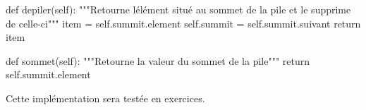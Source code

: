 \documentclass[
  a4paper,
  DIV=11,
  numbers=noendperiod]{scrartcl}
\newenvironment{Shaded}{\begin{snugshade}}{\end{snugshade}}
\newcommand{\CommentTok}[1]{\textcolor[rgb]{0.37,0.37,0.37}{#1}}
\newcommand{\ControlFlowTok}[1]{\textcolor[rgb]{0.00,0.23,0.31}{#1}}
\newcommand{\KeywordTok}[1]{\textcolor[rgb]{0.00,0.23,0.31}{#1}}
\newcommand{\NormalTok}[1]{\textcolor[rgb]{0.00,0.23,0.31}{#1}}
\newcommand{\OperatorTok}[1]{\textcolor[rgb]{0.37,0.37,0.37}{#1}}
\newcommand{\VariableTok}[1]{\textcolor[rgb]{0.07,0.07,0.07}{#1}}
\begin{document}
\begin{Shaded}
\begin{Highlighting}[]
    \KeywordTok{def}\NormalTok{ depiler(}\VariableTok{self}\NormalTok{):}
        \CommentTok{"""Retourne l\textquotesingle{}élément situé au sommet de la pile}
\CommentTok{        et le supprime de celle{-}ci"""}
\NormalTok{        item }\OperatorTok{=} \VariableTok{self}\NormalTok{.summit.element}
        \VariableTok{self}\NormalTok{.summit }\OperatorTok{=} \VariableTok{self}\NormalTok{.summit.suivant}
        \ControlFlowTok{return}\NormalTok{ item}

    \KeywordTok{def}\NormalTok{ sommet(}\VariableTok{self}\NormalTok{):}
        \CommentTok{"""Retourne la valeur du sommet de la pile"""}
        \ControlFlowTok{return} \VariableTok{self}\NormalTok{.summit.element}

\end{Highlighting}
\end{Shaded}

Cette implémentation sera testée en exercices.
\end{document}
